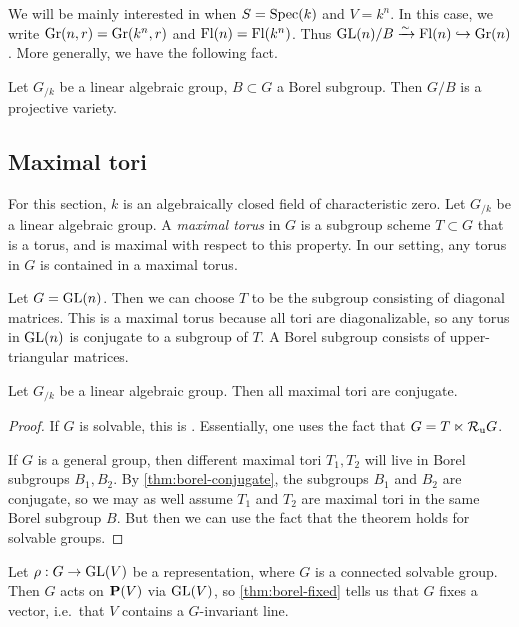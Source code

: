 We will be mainly interested in when $S=\operatorname{Spec}(k)$ and 
$V=k^n$. In this case, we write $\operatorname{Gr}(n,r)=\operatorname{Gr}(k^n,r)$ 
and $\operatorname{Fl}(n)=\operatorname{Fl}(k^n)$. Thus $\operatorname{GL}(n)/B\xrightarrow\sim \operatorname{Fl}(n)\hookrightarrow \operatorname{Gr}(n)$. 
More generally, we have the following fact. 

\begin{theorem}
Let $G_{/k}$ be a linear algebraic group, $B\subset G$ a Borel subgroup. Then 
$G/B$ is a projective variety. 
\end{theorem}






\subsection{Maximal tori}

For this section, $k$ is an algebraically closed field of characteristic 
zero. Let $G_{/k}$ be a linear algebraic group. A \emph{maximal torus} in 
$G$ is a subgroup scheme $T\subset G$ that is a torus, and is maximal with 
respect to this property. In our setting, any torus in $G$ is contained in a 
maximal torus. 


\begin{example}
Let $G=\operatorname{GL}(n)$. Then we can choose $T$ to be the subgroup consisting of 
diagonal matrices. This is a maximal torus because all tori are diagonalizable, 
so any torus in $\operatorname{GL}(n)$ is conjugate to a subgroup of $T$. A Borel subgroup 
consists of upper-triangular matrices. 
\end{example}

\begin{theorem}
Let $G_{/k}$ be a linear algebraic group. Then all maximal tori are conjugate. 
\end{theorem}
\begin{proof}
If $G$ is solvable, this is \cite[17.40]{milne-iAG}. Essentially, one uses 
the fact that $G=T\ltimes \mathcal{R}_\mathrm{u} G$. 

If $G$ is a general group, then different maximal tori $T_1,T_2$ will live in 
Borel subgroups $B_1,B_2$. By \autoref{thm:borel-conjugate}, the subgroups 
$B_1$ and $B_2$ are conjugate, so we may as well assume $T_1$ and $T_2$ are 
maximal tori in the same Borel subgroup $B$. But then we can use the fact that 
the theorem holds for solvable groups. 
\end{proof}

\begin{example}
Let $\rho:G\to \operatorname{GL}(V)$ be a representation, where $G$ is a connected 
solvable group. Then $G$ acts on $\mathbf{P}(V)$ via $\operatorname{GL}(V)$, so 
\autoref{thm:borel-fixed} tells us that $G$ fixes a vector, i.e.~that 
$V$ contains a $G$-invariant line. 
\end{example}





